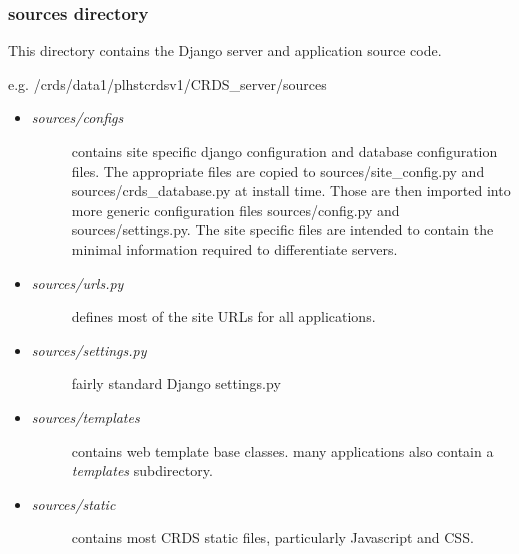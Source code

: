 \documentclass[letterpaper,10pt,english]{sphinxmanual}
\begin{document}
\subsubsection{sources directory}
\label{server_guide:sources-directory}
This directory contains the Django server and application source code.

e.g. /crds/data1/plhstcrdsv1/CRDS\_server/sources
\begin{itemize}
\item {} \begin{description}
\item[{\emph{sources/configs}}] \leavevmode
contains site specific django configuration and database configuration files.  The appropriate files
are copied to sources/site\_config.py and sources/crds\_database.py at install time.   Those are then
imported into more generic configuration files sources/config.py and sources/settings.py.   The site
specific files are intended to contain the minimal information required to differentiate servers.

\end{description}

\item {} \begin{description}
\item[{\emph{sources/urls.py}}] \leavevmode
defines most of the site URLs for all applications.

\end{description}

\item {} \begin{description}
\item[{\emph{sources/settings.py}}] \leavevmode
fairly standard Django settings.py

\end{description}

\item {} \begin{description}
\item[{\emph{sources/templates}}] \leavevmode
contains web template base classes.  many applications also contain a \emph{templates} subdirectory.

\end{description}

\item {} \begin{description}
\item[{\emph{sources/static}}] \leavevmode
contains most CRDS static files,  particularly Javascript and CSS.


\end{description}
\end{itemize}
\end{document}

